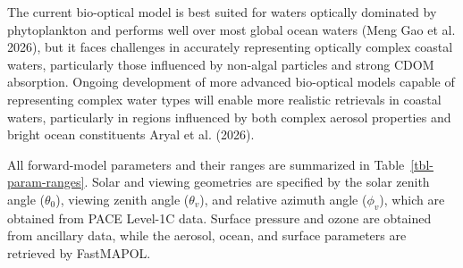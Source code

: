 \documentclass[
  letterpaper,
  open=any]{scrbook}
\begin{document}
The current bio-optical model is best suited for waters optically
dominated by phytoplankton and performs well over most global ocean
waters (Meng Gao et al. 2026), but it faces challenges in accurately
representing optically complex coastal waters, particularly those
influenced by non-algal particles and strong CDOM absorption. Ongoing
development of more advanced bio-optical models capable of representing
complex water types will enable more realistic retrievals in coastal
waters, particularly in regions influenced by both complex aerosol
properties and bright ocean constituents Aryal et al. (2026).

All forward-model parameters and their ranges are summarized in
Table~\ref{tbl-param-ranges}. Solar and viewing geometries are specified
by the solar zenith angle (\(\theta_0\)), viewing zenith angle
(\(\theta_v\)), and relative azimuth angle (\(\phi_v\)), which are
obtained from PACE Level-1C data. Surface pressure and ozone are
obtained from ancillary data, while the aerosol, ocean, and surface
parameters are retrieved by FastMAPOL.
\end{document}
